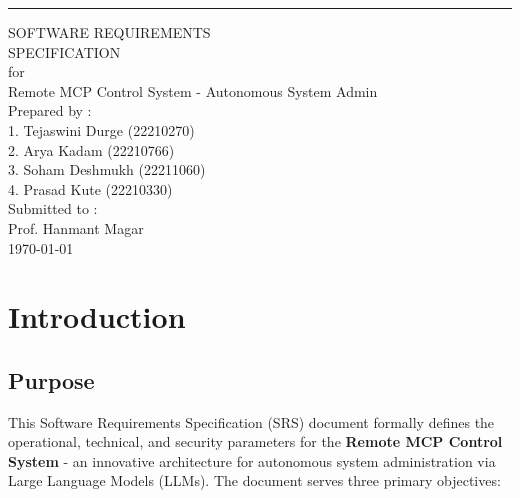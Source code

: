 \documentclass{scrreprt}
\date{}
\begin{document}
\begin{titlepage}
    \begin{flushright}
        \rule{16cm}{5pt}\vskip1cm
        \begin{bfseries}
            \Huge{SOFTWARE REQUIREMENTS\\ SPECIFICATION}\\
            \vspace{1.5cm}
            for\\
            \vspace{1.5cm}
            \Large{Remote MCP Control System - Autonomous System Admin}\\
            \vspace{1.5cm}
            \Large{Prepared by :}\\
            \vspace{0.5cm}
            1. Tejaswini Durge (22210270)\\
            2. Arya Kadam (22210766)\\
            3. Soham Deshmukh (22211060)\\
            4. Prasad Kute (22210330)\\
            \vspace{1.5cm}
            \Large{Submitted to :}\\
            \vspace{0.5cm}
            Prof. Hanmant Magar\\
            \vspace{1.5cm}
            \Large{\today}\\
        \end{bfseries}
    \end{flushright}
\end{titlepage}

\tableofcontents
\newpage

\chapter{Introduction}
\label{chap:introduction}

\section{Purpose}
\label{sec:purpose}
This Software Requirements Specification (SRS) document formally defines the operational, technical, and security parameters for the \textbf{Remote MCP Control System} - an innovative architecture for autonomous system administration via Large Language Models (LLMs). The document serves three primary objectives:
\end{document}
